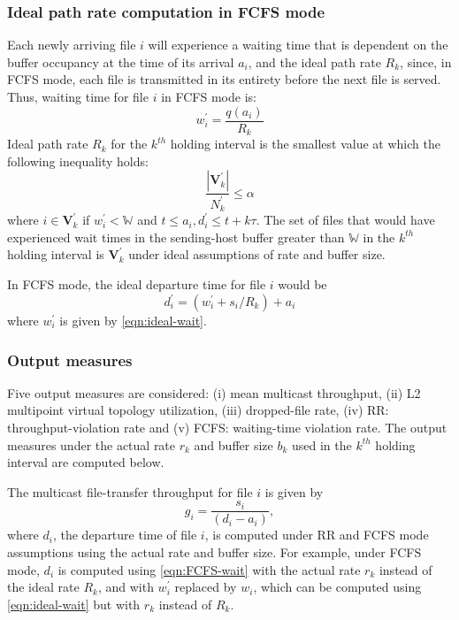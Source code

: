 \subsubsection{Ideal path rate computation in FCFS mode}
\label{sec:rate-FCFS}
Each newly arriving file $i$ will experience a waiting
time that is dependent on the buffer occupancy at the time of its arrival $a_i$,
and the ideal path rate $R_k$, since, in
FCFS mode, each file is transmitted in its entirety before
the next file is served.
Thus, waiting time for file $i$ in FCFS mode is:
\begin{equation} \label{eqn:ideal-wait}
w^{\prime}_i = \frac{q(a_i)}{R_k}
\end{equation}
Ideal path rate $R_k$ for the $k^{th}$ holding interval is the smallest value
at which the following inequality holds:
\begin{equation}
\frac{\left\vert\textbf{V}^{\prime}_k\right\vert}{N^{\prime}_k} \leq \alpha
\end{equation}
where $i \in \textbf{V}^{\prime}_k$ if $w^{\prime}_i < \mathbb{W}$
and $t \leq a_i, d^{\prime}_i \leq t+k\tau$.
The set of files that would have experienced wait times in the sending-host buffer greater than $\mathbb{W}$  in the $k^{th}$ holding interval is $\textbf{V}^{\prime}_k$ under ideal assumptions of rate and buffer size.

In FCFS mode, the ideal departure time for file $i$ would be
\begin{equation}\label{eqn:FCFS-wait}
d^{\prime}_i= (w^{\prime}_i + s_i/R_k) + a_i
\end{equation}
where $w^{\prime}_i$ is given by \eqref{eqn:ideal-wait}.

\subsubsection{Output measures}
\label{sec:output}

Five output measures are considered: (i) mean multicast throughput,
(ii) L2 multipoint virtual topology utilization, (iii) dropped-file
rate, (iv) RR: throughput-violation rate and (v) FCFS: waiting-time violation rate. The output measures under the actual rate $r_k$ and
buffer size $b_k$ used in the $k^{th}$ holding interval are computed
below.

The multicast file-transfer throughput for file $i$ is given by
\begin{equation} \label{eqn:file-throughput}
g_i = \frac{s_i}{(d_i - a_i)},
\end{equation}
where $d_i$, the departure time of file $i$, is computed
under RR and FCFS mode assumptions using the actual rate and buffer
size. For example, under FCFS mode, $d_i$ is computed
using \eqref{eqn:FCFS-wait} with
the actual rate $r_k$ instead of the ideal rate $R_k$,
and with $w^{\prime}_i$ replaced by $w_i$, which can be computed
using \eqref{eqn:ideal-wait} but with $r_k$ instead of $R_k$.

